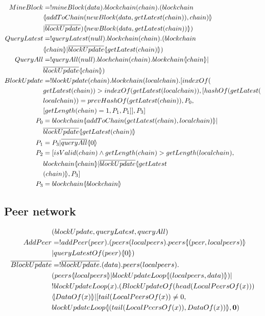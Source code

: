 \begin{align*}
    MineBlock &= !mineBlock(data).blockchain(chain).(blockchain\\
        &\lift{}{addToChain(newBlock(data,getLatest(chain)),chain)}\\
        &|\overline{blockUpdate})\lift{}{newBlock(data, getLatest(chain))})\\
    QueryLatest &=!queryLatest(null).blockchain(chain).(blockchain\\
        &\lift{}{chain}|\overline{blockUpdate}\lift{}{getLatest(chain)})\\
        QueryAll &= !queryAll(null).blochchain(chain).blockchain\lift{}{chain}|\\
        &\overline{blockUpdate}\lift{}{chain})\\
    BlockUpdate &= !blockUpdate(chain).blockchain(localchain).[indexOf(\\
        &getLatest(chain))>indexOf(getLatest(localchain)),[hashOf(getLatest(\\
        &localchain))=prevHashOf(getLatest(chain)),P_0,\\
        &[getLength(chain)=1,P_1,P_1]],P_3]\\
    P_0 &= blockchain\lift{}{addToChain(getLatest(chain),localchain)}|\\
        &\overline{blockUpdate}\lift{}{getLatest(chain)}\\
    P_1 &= P_3|\overline{queryAll}\lift{}{0}\\
    P_2 &= [isValid(chain) \land getLength(chain) > getLength(localchain),\\
        &blockchain\lift{}{chain}|\overline{blockUpdate}\lift{}{getLatest\\
        &(chain)},P_3]\\
    P_3 &= blockchain\lift{}{blockchain}
\end{align*}

\subsection{Peer network}

\begin{align*}
    &(blockUpdate, queryLatest, queryAll)\\
    AddPeer &= !addPeer(peer).(peers(localpeers).peers\lift{}{(peer,localpeers)}\\
        &|queryLatestOf(peer)\lift{}{0})\\
    \overline{BlockUpdate} &= !\overline{blockUpdate}.(data).peers(localpeers).\\
        &(peers\lift{}{localpeers}|blockUpdateLoop\lift{}{(localpeers,data)})|\\
        &!blockUpdateLoop(x).(BlockUpdateOf(head(LocalPeersOf(x)))\\
        &\lift{}{DataOf(x)}|[tail(LocalPeersOf(x))\not= 0,\\
        &blockUpdateLoop\lift{}{(tail(LocalPeersOf(x)),DataOf(x))},\nil)
\end{align*}

